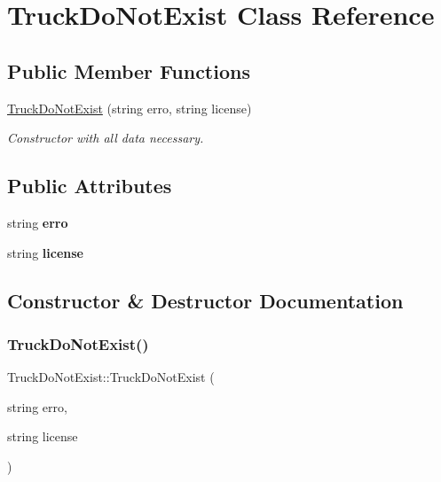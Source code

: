 \hypertarget{class_truck_do_not_exist}{}\section{Truck\+Do\+Not\+Exist Class Reference}
\label{class_truck_do_not_exist}
\subsection*{Public Member Functions}
\begin{DoxyCompactItemize}
\item 
\hyperlink{class_truck_do_not_exist_a3ddb801af2c414865341da459bec4764}{Truck\+Do\+Not\+Exist} (string erro, string license)
\begin{DoxyCompactList}\small\item\em Constructor with all data necessary. \end{DoxyCompactList}\end{DoxyCompactItemize}
\subsection*{Public Attributes}
\begin{DoxyCompactItemize}
\item 
\mbox{\label{class_truck_do_not_exist_aa5c4170dfadd89e2681abe4232f5bed5}} 
string {\bfseries erro}
\item 
\mbox{\label{class_truck_do_not_exist_aa84f15b36bb887ac897b76479fd385d3}} 
string {\bfseries license}
\end{DoxyCompactItemize}


\subsection{Constructor \& Destructor Documentation}
\mbox{\label{class_truck_do_not_exist_a3ddb801af2c414865341da459bec4764}} 
\subsubsection{\texorpdfstring{Truck\+Do\+Not\+Exist()}{TruckDoNotExist()}}
{\footnotesize\ttfamily Truck\+Do\+Not\+Exist\+::\+Truck\+Do\+Not\+Exist (\begin{DoxyParamCaption}\item[{string}]{erro,  }\item[{string}]{license }\end{DoxyParamCaption})\hspace{0.3cm}{\ttfamily [inline]}}



